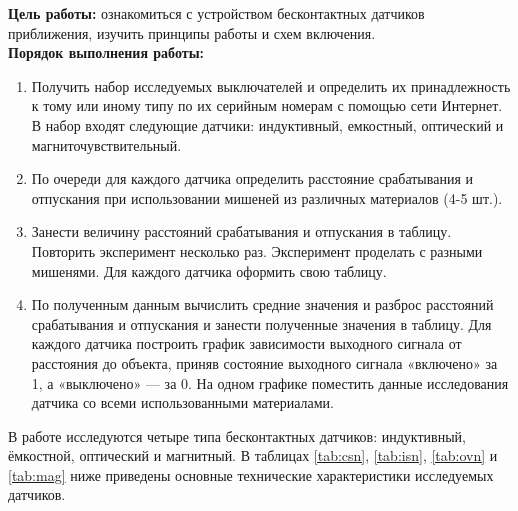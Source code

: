 \documentclass[a4paper]{article}
\begin{document}


\textbf{Цель работы:} ознакомиться с устройством бесконтактных датчиков приближения, изучить принципы работы и схем включения.\\[0.5em]
\textbf{Порядок выполнения работы:}
\begin{enumerate}
    \item Получить набор исследуемых выключателей и определить их принадлежность к тому или иному типу по их серийным номерам с помощью сети Интернет. В набор входят следующие датчики: индуктивный, емкостный, оптический и магниточувствительный.
    \item По очереди для каждого датчика определить расстояние срабатывания и отпускания при использовании мишеней из различных материалов (4-5 шт.).
    \item Занести величину расстояний срабатывания и отпускания в таблицу. Повторить эксперимент несколько раз. Эксперимент проделать с разными мишенями. Для каждого датчика оформить свою таблицу.
    \item По полученным данным вычислить средние значения и разброс расстояний срабатывания и отпускания и занести полученные значения в таблицу. Для каждого датчика построить график зависимости выходного сигнала от расстояния до объекта, приняв состояние выходного сигнала «включено» за 1, а «выключено» — за 0. На одном графике поместить данные исследования датчика со всеми использованными материалами.
\end{enumerate}
В работе исследуются четыре типа бесконтактных датчиков: индуктивный, ёмкостной, оптический и магнитный. В таблицах \ref{tab:csn}, \ref{tab:isn}, \ref{tab:ovn} и \ref{tab:mag} ниже приведены основные технические характеристики исследуемых датчиков.
\end{document}
